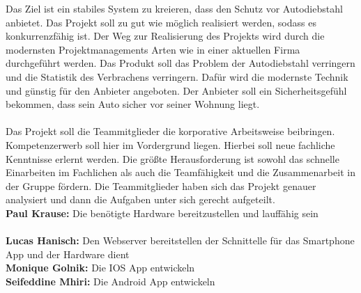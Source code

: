 
Das Ziel ist ein stabiles System zu kreieren, dass den Schutz vor Autodiebstahl anbietet. Das Projekt soll zu gut wie möglich realisiert werden, sodass es konkurrenzfähig ist. 
Der Weg zur Realisierung des Projekts wird durch die modernsten Projektmanagements Arten wie in einer aktuellen Firma durchgeführt werden. 
Das Produkt soll das Problem der Autodiebstahl verringern und die Statistik des Verbrachens verringern. Dafür wird die modernste Technik und günstig für den Anbieter angeboten.
 Der Anbieter soll ein Sicherheitsgefühl bekommen, dass sein Auto sicher vor seiner Wohnung liegt.\\\\
Das Projekt soll die Teammitglieder die korporative Arbeitsweise beibringen. 
Kompetenzerwerb soll hier im Vordergrund liegen. Hierbei soll neue fachliche Kenntnisse erlernt werden.
Die größte Herausforderung ist sowohl das schnelle Einarbeiten im Fachlichen als auch die Teamfähigkeit und die Zusammenarbeit in der Gruppe fördern.
Die Teammitglieder haben sich das Projekt genauer analysiert und dann die Aufgaben unter sich gerecht aufgeteilt.\\
\textbf{Paul Krause:} Die benötigte Hardware bereitzustellen und lauffähig sein\\\\
\textbf{Lucas Hanisch:} Den Webserver bereitstellen der Schnittelle für das Smartphone App und der Hardware dient\\
\textbf{Monique Golnik:} Die IOS App entwickeln\\
\textbf{Seifeddine Mhiri:} Die Android App entwickeln\\